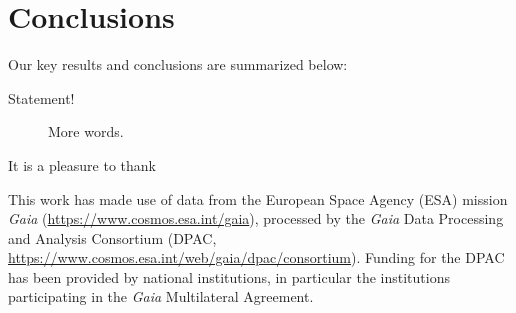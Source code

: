 \documentclass[modern]{aastex63}
\begin{document}
\section{Conclusions}

Our key results and conclusions are summarized below:
\begin{description}
    \item[Statement!] More words.
\end{description}


\acknowledgements

It is a pleasure to thank

This work has made use of data from the European Space Agency (ESA) mission
{\it Gaia} (\url{https://www.cosmos.esa.int/gaia}), processed by the {\it Gaia}
Data Processing and Analysis Consortium (DPAC,
\url{https://www.cosmos.esa.int/web/gaia/dpac/consortium}). Funding for the DPAC
has been provided by national institutions, in particular the institutions
participating in the {\it Gaia} Multilateral Agreement.







\end{document}
